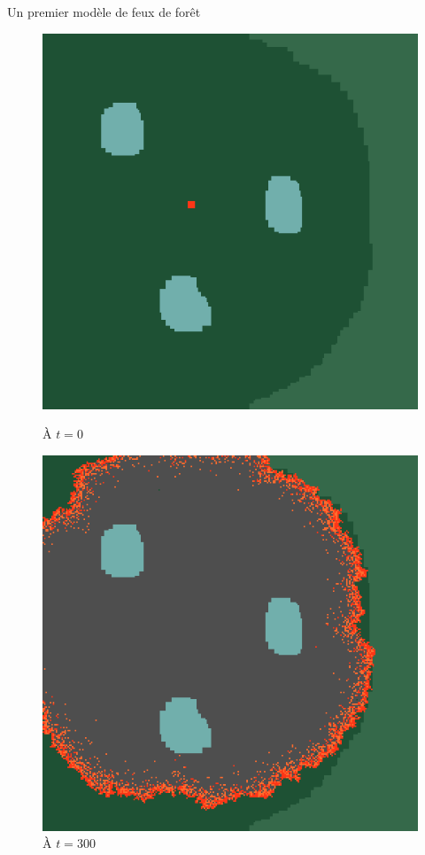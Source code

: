 \documentclass{beamer}
\begin{document}
\begin{frame}{Un premier modèle de feux de forêt \hyperlink{jump}{\beamerbutton{ }} \hypertarget{6}{\beamerbutton{ }}}
    \begin{figure}[!htb]
        \begin{minipage}{0.48\textwidth}
          \centering
          \includegraphics[width=.8\linewidth]{pictures/model1/land_before.png}
          \caption{À $t=0$}\label{Fig:Data1}
        \end{minipage}\hfill
        \begin{minipage}{0.48\textwidth}
          \centering
          \includegraphics[width=.8\linewidth]{pictures/model1/land_300.png}
          \caption{À $t=300$}\label{Fig:Data2}
        \end{minipage}
     \end{figure}
\end{frame}
\end{document}
